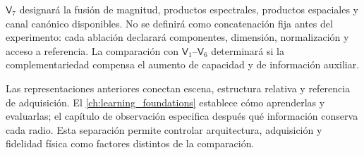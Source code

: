 $\mathsf V_7$ designará la fusión de magnitud, productos espectrales, productos
espaciales y canal canónico disponibles. No se definirá como concatenación fija antes
del experimento: cada ablación declarará componentes, dimensión, normalización y acceso
a referencia. La comparación con $\mathsf V_1$--$\mathsf V_6$ determinará si la
complementariedad compensa el aumento de capacidad y de información auxiliar.

Las representaciones anteriores conectan escena, estructura relativa y referencia de
adquisición. El \cref{ch:learning_foundations} establece cómo aprenderlas y evaluarlas;
el capítulo de observación especifica después qué información conserva cada radio.
Esta separación permite controlar arquitectura, adquisición y fidelidad física como
factores distintos de la comparación.
